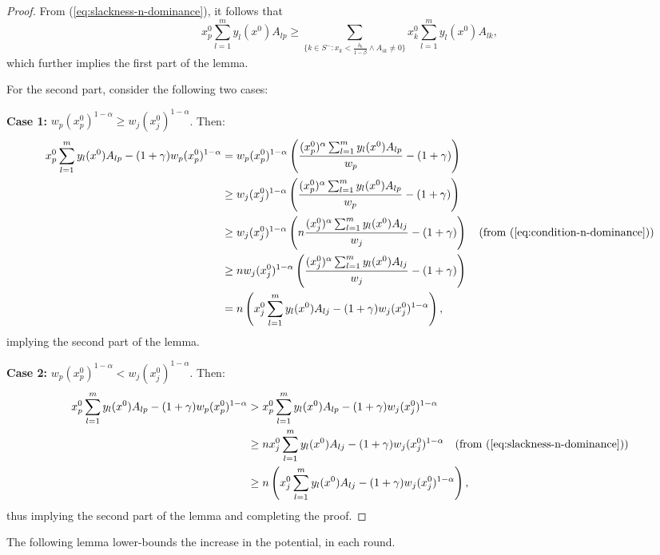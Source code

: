 \documentclass[11pt]{article}
\begin{document}
\begin{proof}
From (\ref{eq:slackness-n-dominance}), it follows that 
\begin{equation*}x_p^0\sum_{l=1}^m y_l(x^0)A_{lp} \geq \sum_{\{k \in S^-: x_k <\frac{\delta_k}{1-\beta}\wedge A_{ik}\neq 0\}}x_k^0\sum_{l=1}^m y_l(x^0)A_{lk},
\end{equation*}
which further implies the first part of the lemma.

For the second part, consider the following two cases:

\noindent\textbf{Case 1:} $w_p(x_p^0)^{1-\alpha} \geq w_j(x_j^0)^{1-\alpha}$. Then:
\begin{align*}
x_p^0\sum_{l=1}^m y_l(x^0)A_{lp} - (1+\gamma)w_p(x_p^0)^{1-\alpha} &= w_p(x_p^0)^{1-\alpha}\left(\frac{(x_p^0)^{\alpha}\sum_{l=1}^m y_l(x^0)A_{lp}}{w_p} - (1+\gamma)\right)\\
&\geq w_j(x_j^0)^{1-\alpha}\left(\frac{(x_p^0)^{\alpha}\sum_{l=1}^m y_l(x^0)A_{lp}}{w_p} - (1+\gamma)\right)\\
&\geq w_j(x_j^0)^{1-\alpha}\left(n\frac{(x_j^0)^{\alpha}\sum_{l=1}^m y_l(x^0)A_{lj}}{w_j} - (1+\gamma)\right)\quad (\text{from (\ref{eq:condition-n-dominance})}) \\
&\geq n w_j(x_j^0)^{1-\alpha}\left(\frac{(x_j^0)^{\alpha}\sum_{l=1}^m y_l(x^0)A_{lj}}{w_j} - (1+\gamma)\right)\\
&= n\left(x_j^0\sum_{l=1}^m y_l(x^0)A_{lj} - (1+\gamma)w_j(x_j^0)^{1-\alpha}\right),
\end{align*}
implying the second part of the lemma.

\noindent\textbf{Case 2:} $w_p(x_p^0)^{1-\alpha} < w_j(x_j^0)^{1-\alpha}$. Then:
\begin{align*}
x_p^0\sum_{l=1}^m y_l(x^0)A_{lp} - (1+\gamma)w_p(x_p^0)^{1-\alpha} &> x_p^0\sum_{l=1}^m y_l(x^0)A_{lp} - (1+\gamma)w_j(x_j^0)^{1-\alpha}\\
&\geq n x_j^0\sum_{l=1}^m y_l(x^0)A_{lj} - (1+\gamma)w_j(x_j^0)^{1-\alpha}\quad (\text{from (\ref{eq:slackness-n-dominance})}) \\
&\geq n \left( x_j^0\sum_{l=1}^m y_l(x^0)A_{lj} - (1+\gamma)w_j(x_j^0)^{1-\alpha} \right),
\end{align*}
thus implying the second part of the lemma and completing the proof.
\end{proof}
The following lemma lower-bounds the increase in the potential, in each round.
\end{document}
